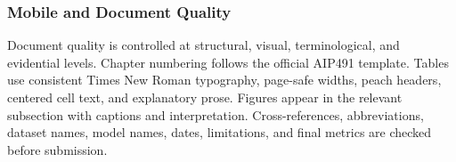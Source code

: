 \subsubsection{Mobile and Document Quality}
Document quality is controlled at structural, visual, terminological, and evidential levels. Chapter numbering follows the official AIP491 template. Tables use consistent Times New Roman typography, page-safe widths, peach headers, centered cell text, and explanatory prose. Figures appear in the relevant subsection with captions and interpretation. Cross-references, abbreviations, dataset names, model names, dates, limitations, and final metrics are checked before submission.\par
